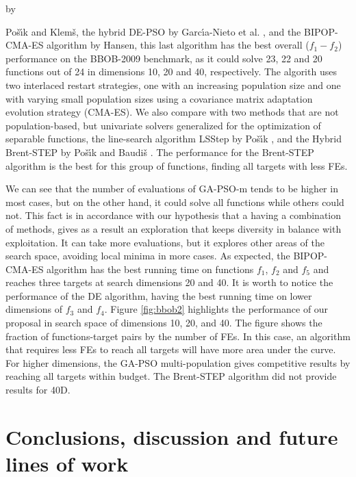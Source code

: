 \documentclass[runningheads]{llncs}
\begin{document}
by {Po{\v{s}}{\'\i}k and Klem{\v{s}},
the hybrid DE-PSO by Garc{\'\i}a-Nieto et
al. \cite{garcia2009noiseless},
and the BIPOP-CMA-ES algorithm \cite{hansen2009benchmarking} by Hansen, this last algorithm has the
best overall ($f_1-f_2$) performance on the BBOB-2009 benchmark,
as it  could solve 23, 22 and 20 functions out of 24 in dimensions 10, 20 and
40, respectively.  The algorith uses two interlaced restart strategies, 
one with an increasing population size and one with varying small population sizes using
a covariance matrix adaptation evolution strategy (CMA-ES).
We also compare with two methods that are not population-based, but univariate
solvers generalized for the optimization of separable functions, the
line-search algorithm LSStep by Po{\v{s}}{\'\i}k \cite{povsik2009bbob}, and the Hybrid Brent-STEP by
Po{\v{s}}{\'\i}k and Baudi{\v{s}} \cite{povsik2015dimension}. The performance for the Brent-STEP algorithm
is the best for this group of functions, finding all targets with less FEs.

We can see that the number of evaluations of {\sf GA-PSO-m} tends to be higher
in most cases, but on the other hand, it could solve all functions
while others could not. This fact is in accordance with our hypothesis
that a having a combination of methods, gives as a result an 
exploration that keeps diversity in balance with exploitation.
It can take more evaluations, but it explores other areas of the search space, avoiding 
local minima in more cases.
As expected, the BIPOP-CMA-ES algorithm has the best running time on functions
$f_1$, $f_2$ and $f_5$ and reaches three targets at search dimensions 20 and 40.
It is worth to notice the performance of the DE algorithm, having the best
running time on lower dimensions of  $f_3$ and $f_4$.
Figure \ref{fig:bbob2} highlights the performance of our proposal in search
space of dimensions 10, 20, and 40. The figure shows the fraction of
functions-target pairs by the number of FEs. In this case, an algorithm that
requires less FEs to reach all targets will have more area under the curve. For
higher dimensions, the GA-PSO multi-population gives competitive results by
reaching all targets within budget. The Brent-STEP algorithm did not provide
results for 40D.

\section{Conclusions, discussion and future lines of work}
\label{conclusions}

}
\end{document}
